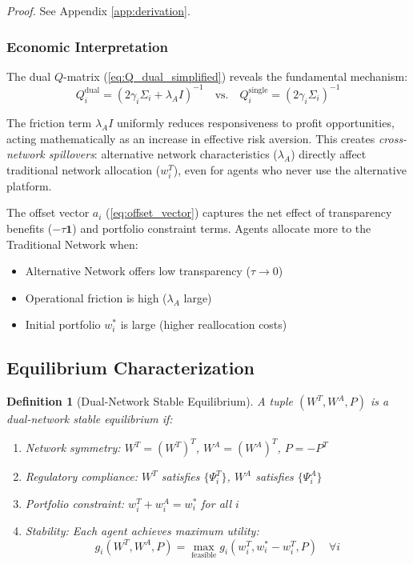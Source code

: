 \documentclass[12pt]{article}
\newtheorem{definition}[theorem]{Definition}
\begin{document}
\textit{Proof.} See Appendix \ref{app:derivation}.

\subsubsection{Economic Interpretation}

The dual $Q$-matrix (\ref{eq:Q_dual_simplified}) reveals the fundamental mechanism:
\begin{equation}
Q_i^{\text{dual}} = (2\gamma_i\Sigma_i + \lambda_A I)^{-1} \quad \text{vs.} \quad Q_i^{\text{single}} = (2\gamma_i\Sigma_i)^{-1}
\end{equation}

The friction term $\lambda_A I$ uniformly reduces responsiveness to profit opportunities, acting mathematically as an increase in effective risk aversion. This creates \textit{cross-network spillovers}: alternative network characteristics ($\lambda_A$) directly affect traditional network allocation ($w_i^T$), even for agents who never use the alternative platform.

The offset vector $a_i$ (\ref{eq:offset_vector}) captures the net effect of transparency benefits ($-\tau \mathbf{1}$) and portfolio constraint terms. Agents allocate more to the Traditional Network when:
\begin{itemize}[noitemsep]
    \item Alternative Network offers low transparency ($\tau \to 0$)
    \item Operational friction is high ($\lambda_A$ large)
    \item Initial portfolio $w_i^*$ is large (higher reallocation costs)
\end{itemize}

\subsection{Equilibrium Characterization}

\begin{definition}[Dual-Network Stable Equilibrium]
A tuple $(W^T, W^A, P)$ is a \textit{dual-network stable equilibrium} if:
\begin{enumerate}[noitemsep]
    \item Network symmetry: $W^T = (W^T)^T$, $W^A = (W^A)^T$, $P = -P^T$
    \item Regulatory compliance: $W^T$ satisfies $\{\Psi_i^T\}$, $W^A$ satisfies $\{\Psi_i^A\}$
    \item Portfolio constraint: $w_i^T + w_i^A = w_i^*$ for all $i$
    \item Stability: Each agent achieves maximum utility:
    \[
    g_i(W^T, W^A, P) = \max_{\text{feasible}} g_i(w_i^T, w_i^* - w_i^T, P) \quad \forall i
    \]
\end{enumerate}
\end{definition}
\end{document}
